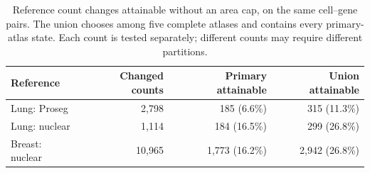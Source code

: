 \begin{table}[ht]\centering
\begin{tabular}{lrrr}\toprule
Reference&Changed counts&Primary attainable&Union attainable\\\midrule
Lung: Proseg&2,798&185 (6.6\%)&315 (11.3\%)\\
Lung: nuclear&1,114&184 (16.5\%)&299 (26.8\%)\\
Breast: nuclear&10,965&1,773 (16.2\%)&2,942 (26.8\%)\\\bottomrule
\end{tabular}
\caption{Reference count changes attainable without an area cap, on the same cell--gene pairs. The union chooses among five complete atlases and contains every primary-atlas state. Each count is tested separately; different counts may require different partitions.}\label{tab:union-reach}
\end{table}
